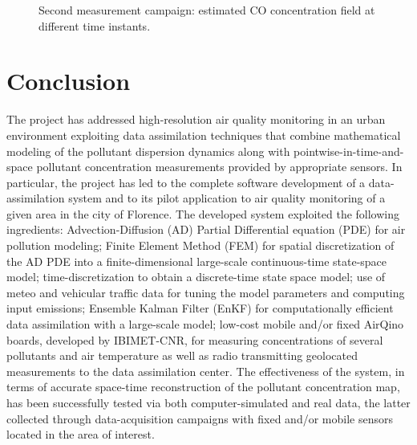 \documentclass[journal]{IEEEtran}
\begin{document}
\begin{figure}[p]
{		\label{fig:nodes_tetra_3D}}
	\caption{Second measurement campaign: estimated CO concentration field at different time instants.}
	\label{fig:co_real_field}
\end{figure}




\section{Conclusion}
The project has addressed high-resolution air quality monitoring in an urban environment
exploiting data assimilation techniques that combine mathematical
modeling of the pollutant dispersion dynamics along with pointwise-in-time-and-
space pollutant concentration measurements provided by appropriate
sensors. In particular, the project has led to the complete software development
of a data-assimilation system and to its pilot application to air
quality monitoring of a given area in the city of Florence. The developed
system exploited the following ingredients: Advection-Diffusion (AD) Partial Differential equation (PDE)
for air pollution modeling; Finite Element Method (FEM) for spatial discretization of the AD
PDE into a finite-dimensional large-scale continuous-time state-space
model; time-discretization to obtain a discrete-time state space model;
use of meteo and vehicular traffic data for tuning the model parameters
and computing input emissions;
Ensemble Kalman Filter (EnKF) for computationally efficient data assimilation with a large-scale model;
low-cost mobile and/or fixed AirQino boards, developed by IBIMET-CNR,
for measuring concentrations of several pollutants and air temperature
as well as radio transmitting geolocated measurements to the
data assimilation center.
The effectiveness of the system, in terms of accurate space-time reconstruction
of the pollutant concentration map, has been successfully tested via both
computer-simulated and real data, the latter collected through
data-acquisition campaigns with fixed and/or mobile sensors located in the
area of interest.
\end{document}
